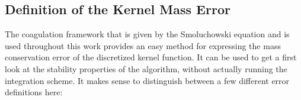 


    \subsection{Definition of the Kernel Mass Error}

        The coagulation framework that is given by the Smoluchowski equation and is 
        used throughout this work provides an easy method for expressing the mass 
        conservation error of the discretized kernel function. 
        It can be used to get a first look at the stability properties of the algorithm, 
        without actually running the integration scheme. It makes sense to distinguish 
        between a few different error definitions here:

